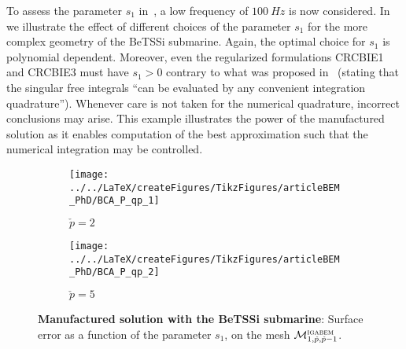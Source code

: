 To assess the parameter $s_1$ in~, a low frequency of $\SI{100}{Hz}$ is now considered. In  we illustrate the effect of different choices of the parameter $s_1$ for the more complex geometry of the BeTSSi submarine. Again, the optimal choice for $s_1$ is polynomial dependent. Moreover, even the regularized formulations CRCBIE1 and CRCBIE3 must have $s_1>0$ contrary to what was proposed in~\cite{Sun2015bri} (stating that the singular free integrals ``can be evaluated by any convenient integration quadrature''). Whenever care is not taken for the numerical quadrature, incorrect conclusions may arise. This example illustrates the power of the manufactured solution as it enables computation of the best approximation such that the numerical integration may be controlled.
\begin{figure}
	\centering    
	\begin{subfigure}[t]{0.49\textwidth}
		\centering
		\texttt{[image: ../../LaTeX/createFigures/TikzFigures/articleBEM\_PhD/BCA\_P\_qp\_1]}
		\caption{$\check{p} = 2$}
	\end{subfigure}%
	\hspace*{0.02\textwidth}%
	\begin{subfigure}[t]{0.49\textwidth}
		\centering
		\texttt{[image: ../../LaTeX/createFigures/TikzFigures/articleBEM\_PhD/BCA\_P\_qp\_2]}
		\caption{$\check{p} = 5$}
	\end{subfigure}
	\caption{\textbf{Manufactured solution with the BeTSSi submarine}: Surface error as a function of the parameter $s_1$, on the mesh ${\cal M}_{1,\check{p},\check{p}-1}^{\textsc{igabem}}$.}
	\label{Fig3:BCA_P_qp}
\end{figure}


